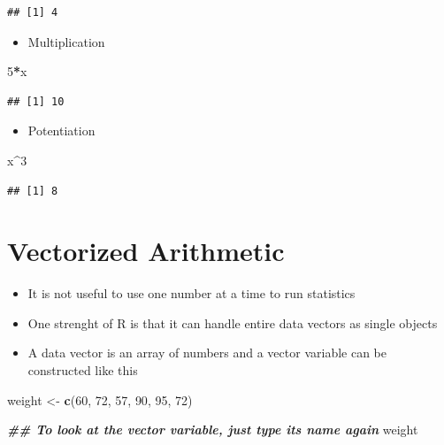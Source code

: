 \documentclass[
]{book}
\newenvironment{Shaded}{\begin{snugshade}}{\end{snugshade}}
\newcommand{\DecValTok}[1]{\textcolor[rgb]{0.00,0.00,0.81}{#1}}
\newcommand{\DocumentationTok}[1]{\textcolor[rgb]{0.56,0.35,0.01}{\textbf{\textit{#1}}}}
\newcommand{\FunctionTok}[1]{\textcolor[rgb]{0.13,0.29,0.53}{\textbf{#1}}}
\newcommand{\NormalTok}[1]{#1}
\newcommand{\OtherTok}[1]{\textcolor[rgb]{0.56,0.35,0.01}{#1}}
\newcommand{\SpecialCharTok}[1]{\textcolor[rgb]{0.81,0.36,0.00}{\textbf{#1}}}
\providecommand{\tightlist}{%
  \setlength{\itemsep}{0pt}\setlength{\parskip}{0pt}}
\begin{document}
\begin{verbatim}
## [1] 4
\end{verbatim}

\begin{itemize}
\tightlist
\item
  Multiplication
\end{itemize}

\begin{Shaded}
\begin{Highlighting}[]
\DecValTok{5}\SpecialCharTok{*}\NormalTok{x}
\end{Highlighting}
\end{Shaded}

\begin{verbatim}
## [1] 10
\end{verbatim}

\begin{itemize}
\tightlist
\item
  Potentiation
\end{itemize}

\begin{Shaded}
\begin{Highlighting}[]
\NormalTok{x}\SpecialCharTok{\^{}}\DecValTok{3} 
\end{Highlighting}
\end{Shaded}

\begin{verbatim}
## [1] 8
\end{verbatim}

\section{Vectorized Arithmetic}\label{vectorized-arithmetic}

\begin{itemize}
\item
  It is not useful to use one number at a time to run statistics
\item
  One strenght of R is that it can handle entire data vectors as single objects
\item
  A data vector is an array of numbers and a vector variable can be constructed like this
\end{itemize}

\begin{Shaded}
\begin{Highlighting}[]
\NormalTok{weight }\OtherTok{\textless{}{-}} \FunctionTok{c}\NormalTok{(}\DecValTok{60}\NormalTok{, }\DecValTok{72}\NormalTok{, }\DecValTok{57}\NormalTok{, }\DecValTok{90}\NormalTok{, }\DecValTok{95}\NormalTok{, }\DecValTok{72}\NormalTok{)}

\DocumentationTok{\#\# To look at the vector variable, just type its name again}
\NormalTok{weight}
\end{Highlighting}
\end{Shaded}
\end{document}
